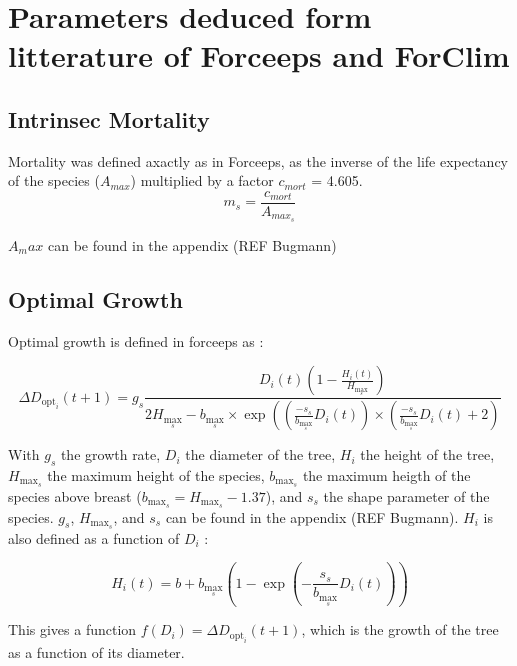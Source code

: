 \documentclass{article}
\begin{document}
\section{Parameters deduced form litterature of Forceeps and ForClim}

\subsection{Intrinsec Mortality}

Mortality was defined axactly as in Forceeps, as the inverse of the life expectancy of the species ($A_{max}$) multiplied by a factor $c_{mort}$ = 4.605.
\begin{equation}
    m_s = \frac{c_{mort}}{A_{max_s}}
\end{equation}

$A_max$ can be found in the appendix (REF Bugmann)

\subsection{Optimal Growth}

Optimal growth is defined in forceeps as :

\begin{equation}
    \Delta D_{\mathrm{opt}_i}(t+1)=g_s \frac{D_i(t)\left(1-\frac{H_i(t)}{H_{\max _s}}\right)}{2 H_{\max _s}-b_{\max _s} \times \exp \left(\left(\frac{-s_s}{b_{\max _s}} D_i(t)\right) \times\left(\frac{-s_s}{b_{\max _s}} D_i(t)+2\right)\right.}
\end{equation}

With $g_s$ the growth rate, $D_i$ the diameter of the tree, $H_i$ the height of the tree, $H_{\max _s}$ the maximum height of the species, $b_{\max _s}$ the maximum heigth of the species above breast ($b_{\max _s} =  H_{\max _s} - 1.37$), and $s_s$ the shape parameter of the species. $g_s$, $H_{\max _s}$, and $s_s$ can be found in the appendix (REF Bugmann). $H_i$ is also defined as a function of $D_i$ :

\begin{equation}
    H_i(t)=b+b_{\max _s}\left(1-\exp \left(-\frac{s_s}{b_{\max _s}} D_i(t)\right)\right)
\end{equation}

This gives a function $f(D_i) = \Delta D_{\mathrm{opt}_i}(t+1)$, which is the growth of the tree as a function of its diameter.
\end{document}
